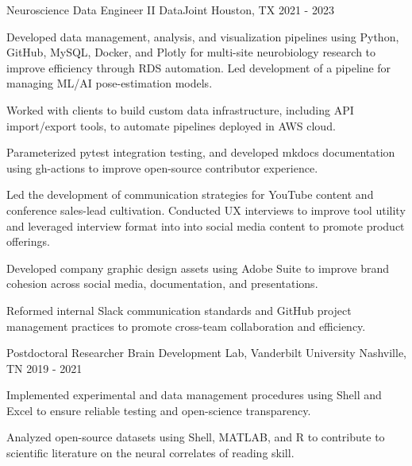 \begin{cventries}
  \cventry
    {Neuroscience Data Engineer II}
    {DataJoint}
    {Houston, TX}
    {2021 - 2023}
    {
      \begin{cvitems}
        \item {Developed data management, analysis, and visualization pipelines using Python, GitHub, MySQL, Docker, and Plotly for multi-site neurobiology research to improve efficiency through RDS automation. Led development of a pipeline for managing ML/AI pose-estimation models.}
        \item {Worked with clients to build custom data infrastructure, including API import/export tools, to automate pipelines deployed in AWS cloud.}
        \item {Parameterized pytest integration testing, and developed mkdocs documentation using gh-actions to improve open-source contributor experience.}
        \item {Led the development of communication strategies for YouTube content and conference sales-lead cultivation. Conducted UX interviews to improve tool utility and leveraged interview format into into social media content to promote product offerings.}
        \item {Developed company graphic design assets using Adobe Suite to improve brand cohesion across social media, documentation, and presentations.}
        \item {Reformed internal Slack communication standards and GitHub project management practices to promote cross-team collaboration and efficiency.}
      \end{cvitems}
    }
\vspace{\baselineskip}  
  \cventry
    {Postdoctoral Researcher}
    {Brain Development Lab, Vanderbilt University}
    {Nashville, TN}
    {2019 - 2021}
    {
      \begin{cvitems}
        \item {Implemented experimental and data management procedures using Shell and Excel to ensure reliable testing and open-science transparency.}
        \item {Analyzed open-source datasets using Shell, MATLAB, and R to contribute to scientific literature on the neural correlates of reading skill.}

\end{cvitems}}
\end{cventries}
